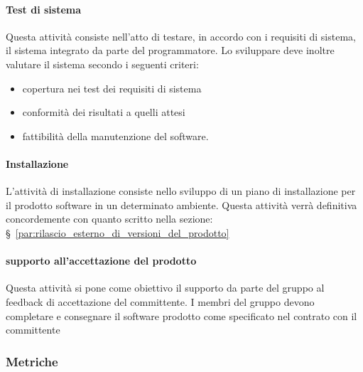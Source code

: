 \documentclass[../../norme-di-progetto.tex]{subfiles}
\begin{document}
\paragraph{Test di sistema}%
\label{par:test_sistema}
Questa attività consiste nell'atto di testare, in accordo con i requisiti di sistema, il sistema integrato da parte del programmatore.
Lo sviluppare deve inoltre valutare il sistema secondo i seguenti criteri:
\begin{itemize}
  \item copertura nei test dei requisiti di sistema
  \item conformità dei risultati a quelli attesi
  \item fattibilità della manutenzione del software.
\end{itemize}

\paragraph{Installazione}%
\label{par:installazione}
L'attività di installazione consiste nello sviluppo di un piano di installazione per il prodotto software in un determinato ambiente.
Questa attività verrà definitiva concordemente con quanto scritto nella sezione: §~\ref{par:rilascio_esterno_di_versioni_del_prodotto}

\paragraph{supporto all'accettazione del prodotto}%
\label{par:supporto_accettazione_prodotto}
Questa attività si pone come obiettivo il supporto da parte del gruppo al feedback di accettazione del committente.
I membri del gruppo devono completare e consegnare il software prodotto come specificato nel contrato con il committente

\subsubsection{Metriche}%
\label{subs:sviluppo/metriche}


\end{document}

